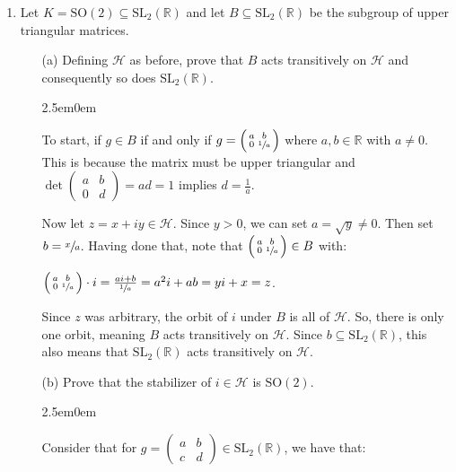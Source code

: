 \documentclass{book}
\newcommand{\exOne}{%
   \color{Purple}%
   \fontsize{13}{15}\selectfont%
}
\newenvironment{myIndent}{%
   \begin{adjustwidth}{2.5em}{0em}%
}{%
   \end{adjustwidth}%
}
\newcommand{\retTwo}{\hfill\bigbreak}
\begin{document}
\begin{enumerate}
	\item Let $K = \mathrm{SO}(2) \subseteq \mathrm{SL}_2(\mathbb{R})$ and let $B \subseteq \mathrm{SL}_2(\mathbb{R})$ be the subgroup of upper triangular matrices.
	
	\begin{enumerate}
		\item[(a)] Defining $\mathcal{H}$ as before, prove that $B$ acts transitively on $\mathcal{H}$ and consequently so does $\mathrm{SL}_2(\mathbb{R})$.
		
		\begin{myIndent}\exOne
			To start, if $g \in B$ if and only if $g = \left(
			\begin{smallmatrix}
				a & b \\ 0 & \sfrac{1}{a}
			\end{smallmatrix}\right)$ where $a, b \in \mathbb{R}$ with $a \neq 0$. This is because the matrix must be upper triangular and $\det \left(
				\begin{smallmatrix}
					a & b \\ 0 & d
				\end{smallmatrix}\right) = ad = 1$ implies $d = \frac{1}{a}$.\retTwo

			Now let $z = x + iy \in \mathcal{H}$. Since $y > 0$, we can set $a = \sqrt{y} \neq 0$. Then set $b = \sfrac{x}{a}$. Having done that, note that $\left(\begin{smallmatrix}
				a & b \\ 0 & \sfrac{1}{a}
			\end{smallmatrix}\right) \in B$ with:
			
			{\centering$\left(\begin{smallmatrix}
				a & b \\ 0 & \sfrac{1}{a}
			\end{smallmatrix}\right) \cdot i = \frac{ai + b}{\sfrac{1}{a}} = a^2 i + ab = yi + x = z$.\retTwo\par}

			Since $z$ was arbitrary, the orbit of $i$ under $B$ is all of $\mathcal{H}$. So, there is only one orbit, meaning $B$ acts transitively on $\mathcal{H}$. Since $b \subseteq \mathrm{SL}_2(\mathbb{R})$, this also means that $\mathrm{SL}_2(\mathbb{R})$ acts transitively on $\mathcal{H}$.\retTwo
		\end{myIndent}

		\item[(b)] Prove that the stabilizer of $i \in \mathcal{H}$ is $\mathrm{SO}(2)$.
		
		
		\begin{myIndent}\exOne
			Consider that for $g = \left(\begin{smallmatrix}
				a & b \\ c & d
			\end{smallmatrix}\right)  \in \mathrm{SL}_2(\mathbb{R})$, we have that:


\end{myIndent}
\end{enumerate}
\end{enumerate}
\end{document}
